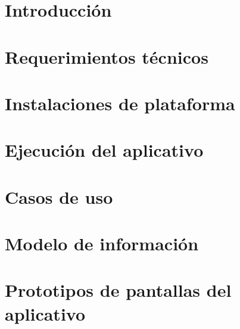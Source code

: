 



	\begin{titlepage}
		
	\end{titlepage}
	
	\tableofcontents
	\newpage
	
    \section{Introducción}
        
		\newpage
       	
    \section{Requerimientos técnicos}
        
        \newpage
        
    \section{Instalaciones de plataforma}
        
		\newpage        
        
    \section{Ejecución del aplicativo}
        
        \newpage
        
    \section{Casos de uso}
        
        \newpage
        
    \section{Modelo de información}
        
        \newpage
        
   	\section{Prototipos de pantallas del aplicativo}
        
        \newpage


